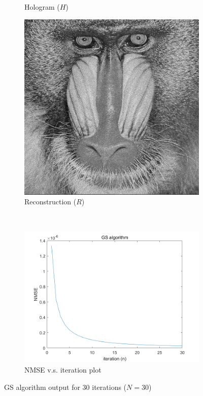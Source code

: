\begin{figure}[H]
\begin{subfigure}[t]{0.3\textwidth}
    \caption{Hologram ($H$)}
    \label{fig:GS_holo_i_30}
  \end{subfigure}
  \hfill
  \begin{subfigure}[t]{0.3\textwidth}
    \centering
    \includegraphics[width=\textwidth]{GS_recon_i_30.png}
    \caption{Reconstruction ($R$)}
    \label{fig:GS_recon_i_30}
  \end{subfigure}
  \\
  \begin{subfigure}[t]{0.7\textwidth}
    \centering
    \includegraphics[width=\textwidth]{GS_NMSE_plot.png}
    \caption{NMSE v.s. iteration plot}
    \label{fig:GS_NMSE_plot}
  \end{subfigure}
  \caption{GS algorithm output for 30 iterations ($N = 30$)}
  \label{fig:GS algorithm output}
\end{figure}


